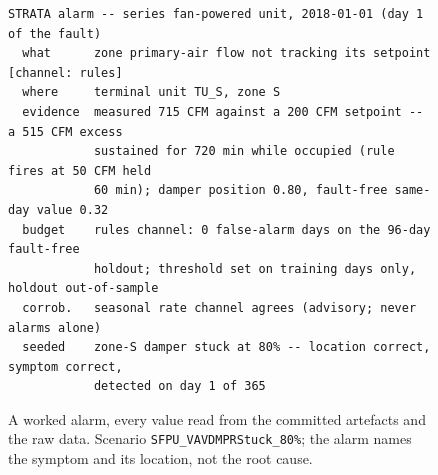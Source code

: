 \documentclass[11pt,letterpaper]{article}
\begin{document}
\begin{figure}[t]
\scriptsize
\begin{verbatim}
STRATA alarm -- series fan-powered unit, 2018-01-01 (day 1 of the fault)
  what      zone primary-air flow not tracking its setpoint   [channel: rules]
  where     terminal unit TU_S, zone S
  evidence  measured 715 CFM against a 200 CFM setpoint -- a 515 CFM excess
            sustained for 720 min while occupied (rule fires at 50 CFM held
            60 min); damper position 0.80, fault-free same-day value 0.32
  budget    rules channel: 0 false-alarm days on the 96-day fault-free
            holdout; threshold set on training days only, holdout out-of-sample
  corrob.   seasonal rate channel agrees (advisory; never alarms alone)
  seeded    zone-S damper stuck at 80% -- location correct, symptom correct,
            detected on day 1 of 365
\end{verbatim}
\caption{A worked alarm, every value read from the committed artefacts and the raw data. Scenario \texttt{SFPU\_VAVDMPRStuck\_80\%}; the alarm names the symptom and its location, not the root cause.}
\label{lst:alarm}
\end{figure}
\end{document}
